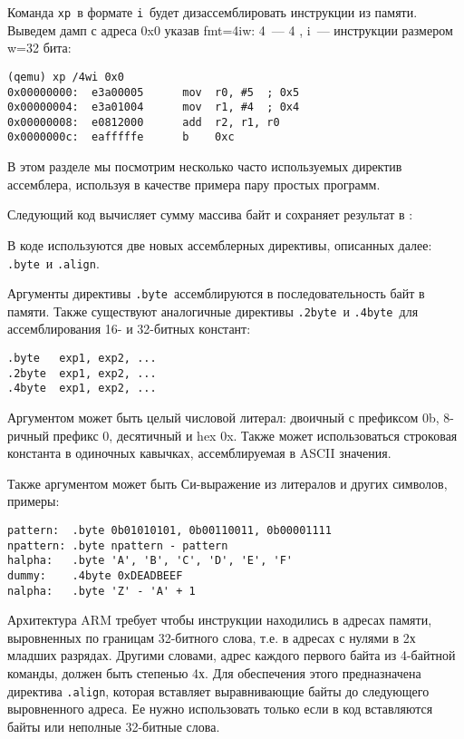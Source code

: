 Команда \verb|xp|\ в формате \verb|i|\ будет дизассемблировать инструкции из
памяти. Выведем дамп с адреса 0x0 указав fmt=4iw: 4\ --- 4 , i\ ---
инструкции размером w=32 бита:

\begin{verbatim}
(qemu) xp /4wi 0x0
0x00000000:  e3a00005      mov  r0, #5  ; 0x5
0x00000004:  e3a01004      mov  r1, #4  ; 0x4
0x00000008:  e0812000      add  r2, r1, r0
0x0000000c:  eafffffe      b    0xc
\end{verbatim}

\secup
{}\secdown

В этом разделе мы посмотрим несколько часто используемых директив ассемблера,
используя в качестве примера пару простых программ.

\secdown

Следующий код вычисляет сумму массива байт и сохраняет результат в :


В коде используются две новых ассемблерных директивы, описанных далее:
\verb|.byte|\ и \verb|.align|.


Аргументы директивы \verb|.byte|\ ассемблируются в последовательность байт в
памяти. Также существуют аналогичные директивы \verb|.2byte|\ и \verb|.4byte|\
для ассемблирования 16- и 32-битных констант:

\begin{verbatim}
.byte   exp1, exp2, ...
.2byte  exp1, exp2, ...
.4byte  exp1, exp2, ...
\end{verbatim}

Аргументом может быть целый числовой литерал: двоичный с префиксом 0b, 8-ричный
префикс 0, десятичный и hex 0x. Также может использоваться строковая константа в
одиночных кавычках, ассемблируемая в ASCII значения.

Также аргументом может быть Си-выражение из литералов и других символов,
примеры:

\begin{verbatim}
pattern:  .byte 0b01010101, 0b00110011, 0b00001111
npattern: .byte npattern - pattern
halpha:   .byte 'A', 'B', 'C', 'D', 'E', 'F'
dummy:    .4byte 0xDEADBEEF
nalpha:   .byte 'Z' - 'A' + 1
\end{verbatim}


Архитектура ARM требует чтобы инструкции находились в адресах памяти,
выровненных по границам 32-битного слова, т.е. в адресах с нулями в 2х младших
разрядах. Другими словами, адрес каждого первого байта из 4-байтной команды,
должен быть степенью 4х. Для обеспечения этого предназначена директива
\verb|.align|, которая вставляет выравнивающие байты до следующего выровненного
адреса. Ее нужно использовать только если в код вставляются байты или неполные
32-битные слова.

